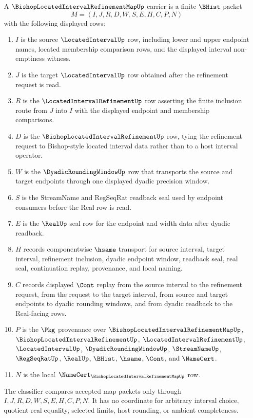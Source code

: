 \begin{definition}
\label{def:bishop-located-interval-refinement-map-carrier}
A $\BishopLocatedIntervalRefinementMapUp$ carrier is a finite $\BHist$ packet
$$
M=(I,J,R,D,W,S,E,H,C,P,N)
$$
with the following displayed rows:
\begin{enumerate}
\item $I$ is the source $\LocatedIntervalUp$ row, including lower and upper endpoint names, located membership comparison rows, and the displayed interval non-emptiness witness.
\item $J$ is the target $\LocatedIntervalUp$ row obtained after the refinement request is read.
\item $R$ is the $\LocatedIntervalRefinementUp$ row asserting the finite inclusion route from $J$ into $I$ with the displayed endpoint and membership comparisons.
\item $D$ is the $\BishopLocatedIntervalRefinementUp$ row, tying the refinement request to Bishop-style located interval data rather than to a host interval operator.
\item $W$ is the $\DyadicRoundingWindowUp$ row that transports the source and target endpoints through one displayed dyadic precision window.
\item $S$ is the StreamName and RegSeqRat readback seal used by endpoint consumers before the Real row is read.
\item $E$ is the $\RealUp$ seal row for the endpoint and width data after dyadic readback.
\item $H$ records componentwise $\hsame$ transport for source interval, target interval, refinement inclusion, dyadic endpoint window, readback seal, real seal, continuation replay, provenance, and local naming.
\item $C$ records displayed $\Cont$ replay from the source interval to the refinement request, from the request to the target interval, from source and target endpoints to dyadic rounding windows, and from dyadic readback to the Real-facing rows.
\item $P$ is the $\Pkg$ provenance over $\BishopLocatedIntervalRefinementMapUp$, $\BishopLocatedIntervalRefinementUp$, $\LocatedIntervalRefinementUp$, $\LocatedIntervalUp$, $\DyadicRoundingWindowUp$, $\StreamNameUp$, $\RegSeqRatUp$, $\RealUp$, $\BHist$, $\hsame$, $\Cont$, and $\NameCert$.
\item $N$ is the local $\NameCert_{\BishopLocatedIntervalRefinementMapUp}$ row.
\end{enumerate}
The classifier compares accepted map packets only through $I,J,R,D,W,S,E,H,C,P,N$. It has no coordinate for arbitrary interval choice, quotient real equality, selected limits, host rounding, or ambient completeness.
\end{definition}

